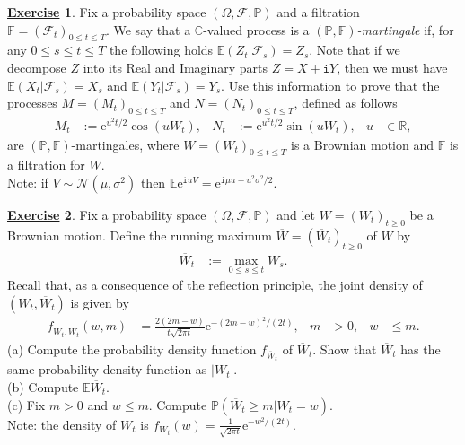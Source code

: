 \documentclass[12pt]{book}
\numberwithin{equation}{chapter}
\theoremstyle{plain}
\numberwithin{theorem}{section}
\theoremstyle{definition}
\newtheorem{exercise}{\underline{Exercise}}
\numberwithin{exercise}{chapter}
\newcommand{\<}{\langle}
\renewcommand{\>}{\rangle}
\renewcommand{\(}{\left(}
\renewcommand{\)}{\right)}
\renewcommand{\[}{\left[}
\renewcommand{\]}{\right]}
\newcommand\Cb{\mathds{C}}
\newcommand\Eb{\mathds{E}}
\newcommand\Fb{\mathds{F}}
\newcommand\Pb{\mathds{P}}
\newcommand\Rb{\mathds{R}}
\newcommand\Fc{\mathscr{F}}
\newcommand\Nc{\mathscr{N}}
\newcommand\Om{\Omega}
\newcommand\sig{\sigma}
\newcommand\Wb{\overline{W}}
\newcommand\ii{\mathtt{i}}
\newcommand\ee{\mathrm{e}}
\begin{document}
\begin{exercise}
\label{exer:7.7}
Fix a probability space $(\Om, \Fc, \Pb)$ and a filtration $\Fb = (\Fc_t)_{0 \leq t \leq T}$.  We say that a $\Cb$-valued process is a \textit{$(\Pb,\Fb)$-martingale} if, for any $0 \leq s \leq t \leq T$ the following holds $\Eb( Z_t | \Fc_s ) = Z_s$.  Note that if we decompose $Z$ into its Real and Imaginary parts $Z = X + \ii Y$, then we must have $\Eb( X_t | \Fc_s ) = X_s$ and $\Eb( Y_t | \Fc_s ) = Y_s$. Use this information to prove that the processes $M=(M_t)_{0 \leq t \leq T}$ and $N=(N_t)_{0 \leq t \leq T}$, defined as follows
\begin{align}
M_t
	&:= \ee^{ u^2 t /2} \cos (u W_t) , &
N_t
	&:=	\ee^{ u^2 t /2} \sin (u W_t) , &
u
	&\in \Rb ,
\end{align}
are $(\Pb,\Fb)$-martingales, where $W = (W_t)_{0 \leq t \leq T}$ is a Brownian motion and $\Fb$ is a filtration for $W$.
\\[0.5em]
Note: if $V \sim \Nc(\mu,\sig^2)$ then $\Eb \ee^{\ii u V} = \ee^{\ii \mu u - u^2 \sig^2 / 2}$.
\end{exercise}

\begin{exercise}
\label{exer:7.8}
Fix a probability space $(\Om, \Fc, \Pb)$ and let $W = (W_t)_{t \geq 0}$ be a Brownian motion.  Define the running maximum $\Wb = (\Wb_t)_{t \geq 0}$ of $W$ by
\begin{align}
\Wb_t
	&:=	\max_{0 \leq s \leq t} W_s .
\end{align}
Recall that, as a consequence of the reflection principle, the joint density of $(W_t,\Wb_t)$ is given by
\begin{align}
f_{W_t,\Wb_t}(w,m)
	&=	\frac{2(2m-w)}{t \sqrt{2\pi t}} \ee^{-(2m-w)^2/(2t)} , &
m
	&>0 , &
w
	&\leq m .
\end{align}
(a) Compute the probability density function $f_{\Wb_t}$ of $\Wb_t$.  Show that $\Wb_t$ has the same probability density function as $|W_t|$.
\\[0.5em]
(b) Compute $\Eb \Wb_t$.
\\[0.5em]
(c) Fix $m > 0$ and $w \leq m$.  Compute $\Pb( \Wb_t \geq m | W_t = w )$.
\\[0.5em]
Note: the density of $W_t$ is $f_{W_t}(w) = \frac{1}{\sqrt{2 \pi t}} \ee^{-w^2/(2t)}$.
\end{exercise}

%
%
\end{document}
